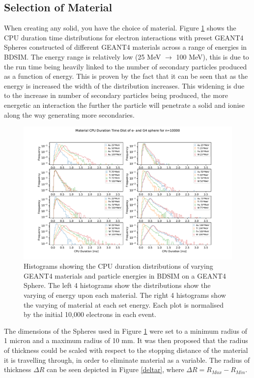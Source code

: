 \documentclass[12pt,a4paper]{article}
\begin{document}
\newpage
\subsection{Selection of Material}
When creating any solid, you have the choice of material. Figure \ref{novar} shows the CPU duration time distributions for electron interactions with preset GEANT4 Spheres constructed of different GEANT4 materials across a range of energies in BDSIM. The energy range is relatively low (25 MeV $\rightarrow$ 100 MeV), this is due to the run time being heavily linked to the number of secondary particles produced as a function of energy. This is proven by the fact that it can be seen that as the energy is increased the width of the distribution increases. This widening is due to the increase in number of secondary particles being produced, the more energetic an interaction the further the particle will penetrate a solid and ionise along the way generating more secondaries.
\begin{figure}[h!]
\centering
\includegraphics[scale=0.6]{Images//Materials//not_Varied_by_radius_and_secondaries.pdf}
\caption[width=\columnwidth]{Histograms showing the CPU duration distributions of varying GEANT4 materials and particle energies in BDSIM on a GEANT4 Sphere. The left 4 histograms show the distributions show the varying of energy upon each material. The right 4 histograms show the varying of material at each set energy. Each plot is normalised by the initial 10,000 electrons in each event.}
\label{novar}
\end{figure}
\newpage
\noindent The dimensions of the Spheres used in Figure \ref{novar} were set to a minimum radius of 1 micron and a maximum radius of 10 mm. It was then proposed that the radius of thickness could be scaled with respect to the stopping distance of the material it is travelling through, in order to eliminate material as a variable. The radius of thickness $\Delta R$ can be seen depicted in Figure \ref{deltar}, where $\Delta R = R_{Max} - R_{Min}$.
\end{document}
